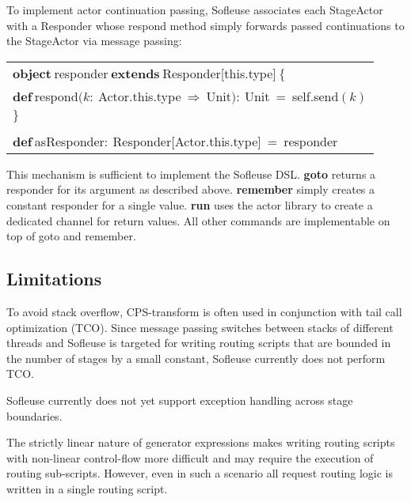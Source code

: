 \documentclass{sig-alternate}
\begin{document}
To implement actor continuation passing, Sofleuse associates each StageActor with a Responder whose
respond method simply forwards passed continuations to the StageActor via message passing:
                                                                                            
\medskip
{\footnotesize\begin{tabular}{l}                                
$\mathbf{object}\ $responder$\ \mathbf{extends}\ $Responder[this.type]$\ \{$\\
\hspace{2ex}$\mathbf{def}\ $respond$(\mathit{k}:\ $Actor.this.type$\ \Rightarrow\ $Unit$):\ $Unit$\ =\ $self.send$(\mathit{k})$\\
$\}$\\
\\
$\mathbf{def}\ $asResponder$:\ $Responder[Actor.this.type]$\ =\ $responder\\
\end{tabular}}
\medskip

This mechanism is sufficient to implement the Sofleuse DSL. \textbf{goto} returns a responder for
its argument as described above. \textbf{remember} simply creates a constant responder for a single
value. \textbf{run} uses the actor library to create a dedicated channel for return values. All
other commands are implementable on top of goto and remember.

                                                       
\subsection{Limitations}

To avoid stack overflow, CPS-transform is often used in conjunction with tail call optimization
(TCO). Since message passing switches between stacks of different threads and Sofleuse is targeted
for writing routing scripts that are bounded in the number of stages by a small constant, Sofleuse
currently does not perform TCO.
    
Sofleuse currently does not yet support exception handling across stage boundaries.

The strictly linear nature of generator expressions makes writing routing scripts with
non-linear control-flow more difficult and may require the execution of routing sub-scripts.  
However, even in such a scenario all request routing logic is written in a single routing
script.
\end{document}
